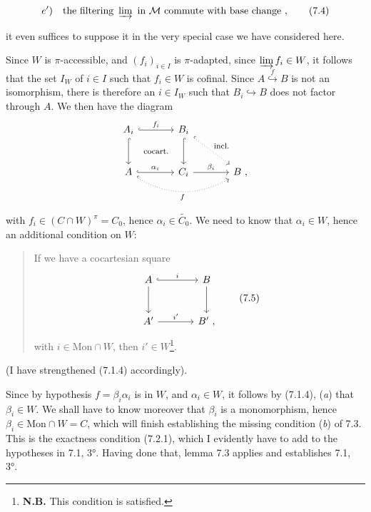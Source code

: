 \documentclass[11pt]{article}
\newcommand{\printedpage}[1]{\marginpar{\footnotesize p.~#1}}
\newcommand{\msp}[1]{\marginpar{\footnotesize [#1]}}
\newcommand{\Mon}{\mathrm{Mon}}
\begin{document}
\msp{page 95}
\[
e')\quad \text{the filtering } \varinjlim \text{ in } \mathcal{M} \text{ commute with base change}\ , \tag*{(7.4)}
\]

it even suffices to suppose it in the very special case we have considered here.

Since $W$ is $\pi$-accessible, and $(f_i)_{i \in I}$ is $\pi$-adapted, since $\varinjlim f_i \in W$, it follows that the set $I_W$ of $i \in I$ such that $f_i \in W$ is cofinal. Since $A \overset{f}{\hookrightarrow} B$ is not an isomorphism, there is therefore an $i \in I_W$ such that $B_i \hookrightarrow B$ does not factor through $A$. We then have the diagram
\[
\begin{tikzcd}[row sep=large, column sep=large]
A_i \arrow[r, hook, "f_i"] \arrow[d, hook] \arrow[rd, phantom, "\text{\footnotesize cocart.}"] & B_i \arrow[d, hook] \arrow[rd, dotted, hook, "\text{\footnotesize incl.}"] & \\
A \arrow[r, hook, "\alpha_i"] \arrow[rr, dotted, hook, bend right, "f"'] & C_i \arrow[r, "\beta_i"] & B \ ,
\end{tikzcd}
\]

\printedpage{53}
with $f_i \in (C \cap W)^{\pi} = C_0$, hence $\alpha_i \in \widetilde{C_0}$. We need to know that $\alpha_i \in W$, hence an additional condition on $W$:

\begin{quote}
If we have a cocartesian square
\[
\begin{tikzcd}[row sep=large, column sep=large]
A \arrow[r, hook, "i"] \arrow[d] & B \arrow[d] \\
A' \arrow[r, "{i'}"] & B' \ ,
\end{tikzcd}
\tag*{(7.5)}
\]
with $i \in \Mon \cap W$, then $i' \in W$\footnote[34]{\textbf{N.B.} This condition is satisfied.}.
\end{quote}

(I have strengthened (7.1.4) accordingly).

\msp{page 96}

Since by hypothesis $f = \beta_i \alpha_i$ is in $W$, and $\alpha_i \in W$, it follows by (7.1.4), (\textit{a}) that $\beta_i \in W$. We shall have to know moreover that $\beta_i$ is a monomorphism, hence $\beta_i \in \Mon \cap W = C$, which will finish establishing the missing condition (\textit{b}) of 7.3. This is the exactness condition (7.2.1), which I evidently have to add to the hypotheses in 7.1, 3°. Having done that, lemma 7.3 applies and establishes 7.1, 3°.
\end{document}
